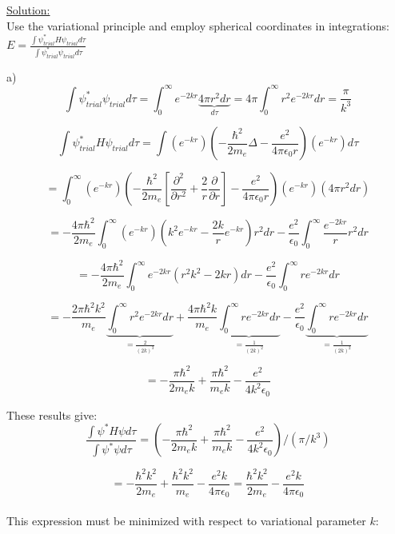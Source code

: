 \noindent
\underline{Solution:}\\

\noindent
Use the variational principle and employ spherical coordinates in integrations:\\

$E = \frac{\int\psi^*_{trial}H\psi_{trial}d\tau}{\int\psi^*_{trial}\psi_{trial}d\tau}$

\noindent
a)
$$\int\psi^*_{trial}\psi_{trial}d\tau = \int_0^\infty e^{-2kr}
\underbrace{4\pi r^2dr}_{d\tau} = 4\pi\int_0^\infty r^2e^{-2kr}dr
= \frac{\pi}{k^3}$$

$$\int\psi_{trial}^*H\psi_{trial}d\tau = \int\left( e^{-kr}\right)
\left( -\frac{\hbar^2}{2m_e}\Delta - \frac{e^2}{4\pi\epsilon_0r}\right)
\left( e^{-kr}\right)d\tau$$

$$= \int_0^\infty\left( e^{-kr}\right)
\left( -\frac{\hbar^2}{2m_e}\left[\frac{\partial^2}{\partial r^2} + \frac{2}{r}\frac{\partial}
{\partial r}\right] - \frac{e^2}{4\pi\epsilon_0r}\right)\left( e^{-kr}\right)
\left( 4\pi r^2dr\right)$$

$$= -\frac{4\pi\hbar^2}{2m_e}\int_0^\infty \left( e^{-kr}\right)
\left( k^2e^{-kr} - \frac{2k}{r}e^{-kr}\right)r^2dr 
- \frac{e^2}{\epsilon_0}\int_0^\infty\frac{e^{-2kr}}{r}r^2dr$$

$$= -\frac{4\pi\hbar^2}{2m_e}\int_0^\infty e^{-2kr}(r^2k^2 - 2kr)dr
- \frac{e^2}{\epsilon_0}\int_0^\infty re^{-2kr}dr$$

$$= -\frac{2\pi\hbar^2k^2}{m_e}\underbrace{\int_0^\infty r^2 e^{-2kr}dr}_{= \frac{2}{(2k)^3}}
+ \frac{4\pi\hbar^2k}{m_e}\underbrace{\int_0^\infty re^{-2kr}dr}_{= 
\frac{1}{(2k)^2}} - \frac{e^2}{\epsilon_0}\underbrace{\int_0^\infty
re^{-2kr}dr}_{= \frac{1}{(2k)^2}}$$

$$= -\frac{\pi\hbar^2}{2m_ek} + \frac{\pi\hbar^2}{m_ek}
- \frac{e^2}{4k^2\epsilon_0}$$

\noindent
These results give:\\

$$\frac{\int\psi^*H\psi d\tau}{\int\psi^*\psi d\tau} =
\left( -\frac{\pi\hbar^2}{2m_ek} + \frac{\pi\hbar^2}{m_ek}
- \frac{e^2}{4k^2\epsilon_0}\right) / \left( \pi / k^3\right)$$

$$ = -\frac{\hbar^2k^2}{2m_e} + \frac{\hbar^2k^2}{m_e} - \frac{e^2k}
{4\pi\epsilon_0} = \frac{\hbar^2k^2}{2m_e} - \frac{e^2k}{4\pi\epsilon_0}$$\\

\noindent
This expression must be minimized with respect to variational parameter
$k$:\\


